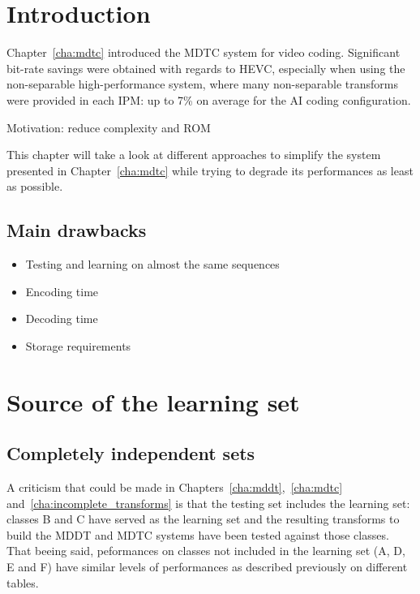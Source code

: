 \documentclass[11pt,a4paper,openright,twoside]{book}
\numberwithin{equation}{section} %
\numberwithin{figure}{section} %
\numberwithin{table}{section} %
\begin{document}
\section{Introduction}
\label{sec:rw_introduction}

Chapter~\ref{cha:mdtc} introduced the \acf{MDTC} system for video coding.
Significant bit-rate savings were obtained with regards to \ac{HEVC},
especially when using the non-separable high-performance system, where many
non-separable transforms were provided in each \ac{IPM}:
up to 7\% on average for the \ac{AI} coding configuration.

Motivation: reduce complexity and ROM

This chapter will take a look at different approaches to simplify the
system presented in Chapter~\ref{cha:mdtc} while trying to degrade its
performances as least as possible.

\subsection{Main drawbacks}
\label{sub:main_drawbacks}

\begin{itemize}
	\item Testing and learning on almost the same sequences
	\item Encoding time
	\item Decoding time
	\item Storage requirements
\end{itemize}

\section{Source of the learning set}
\label{sec:rw_source_of_the_learning_set}

\subsection{Completely independent sets}
\label{sub:rw_completely_independent_sets}

A criticism that could be made in
Chapters~\ref{cha:mddt},~\ref{cha:mdtc} and~\ref{cha:incomplete_transforms} is
that the testing set includes the learning set:
classes B and C have served as the learning set and the resulting transforms
to build the \ac{MDDT} and \ac{MDTC} systems have been tested against those
classes.
That beeing said, peformances on classes not included in the learning set (A,
D, E and F) have similar levels of performances as described previously on
different tables.
\end{document}
